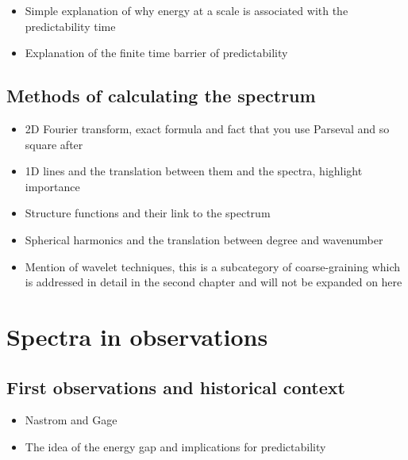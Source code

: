 \begin{itemize}

\item{Simple explanation of why energy at a scale is associated with the predictability time}

\item{Explanation of the finite time barrier of predictability}

\end{itemize}

\subsection{Methods of calculating the spectrum}

\begin{itemize}

\item{2D Fourier transform, exact formula and fact that you use Parseval and so square after}

\item{1D lines and the translation between them and the spectra, highlight importance}

\item{Structure functions and their link to the spectrum}

\item{Spherical harmonics and the translation between degree and wavenumber}

\item{Mention of wavelet techniques, this is a subcategory of coarse-graining which is addressed in detail in the second chapter and will not be expanded on here}

\end{itemize}

\section{Spectra in observations}

\subsection{First observations and historical context}

\begin{itemize}

\item{Nastrom and Gage}

\item{The idea of the energy gap and implications for predictability}

\end{itemize}

